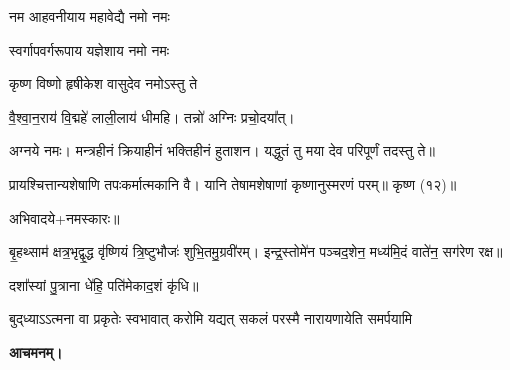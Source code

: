 {नम आहवनीयाय महावेद्यै नमो नमः}

{स्वर्गापवर्गरूपाय यज्ञेशाय नमो नमः}

{कृष्ण विष्णो हृषीकेश वासुदेव नमोऽस्तु ते}

वै॒श्वा॒न॒राय॑ वि॒द्महे॑ लाली॒लाय॑ धीमहि। 
तन्नो॑ अग्निः प्रचो॒दया᳚त्। 

अग्नये नमः। मन्त्रहीनं क्रियाहीनं भक्तिहीनं हुताशन।
यद्धुतं तु मया देव परिपूर्णं तदस्तु ते॥

प्रायश्चित्तान्यशेषाणि तपःकर्मात्मकानि वै।
यानि तेषामशेषाणां कृष्णानुस्मरणं परम्॥ कृष्ण (१२)॥

अभिवादये+नमस्कारः॥

बृ॒हथ्साम॑ क्षत्र॒भृद्वृ॒द्ध वृ॑ष्णियं त्रि॒ष्टुभौजः॑ शुभि॒तमु॒ग्रवी॑रम्।
इन्द्र॒स्तोमे॑न पञ्चद॒शेन॒ मध्य॑मि॒दं वाते॑न॒ सग॑रेण रक्ष॥

दशा᳚स्यां पु॒त्राना धे॑हि॒ पति॑मेकाद॒शं कृ॑धि॥

{बुद्‌ध्याऽऽत्मना वा प्रकृतेः स्वभावात्}
{करोमि यद्यत् सकलं परस्मै}
{नारायणायेति समर्पयामि}

\textbf{आचमनम्।}
